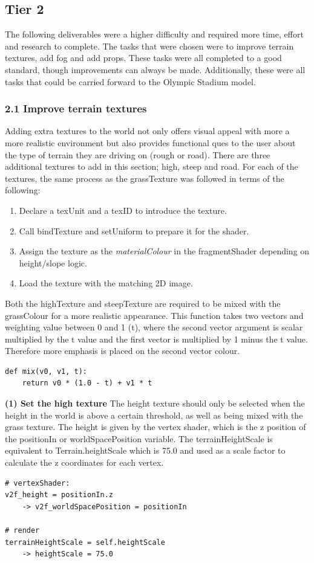 \documentclass[a4 paper, 12pt]{article}
\begin{document}
\subsection{Tier 2}
The following deliverables were a higher difficulty and required more time, effort and research to complete. The tasks that were chosen were to improve terrain textures, add fog and add props. These tasks were all completed to a good standard, though improvements can always be made. Additionally, these were all tasks that could be carried forward to the Olympic Stadium model. 

\subsubsection{2.1 Improve terrain textures}
Adding extra textures to the world not only offers visual appeal with more a more realistic environment but also provides functional ques to the user about the type of terrain they are driving on (rough or road). There are three additional textures to add in this section; high, steep and road. For each of the textures, the same process as the grassTexture was followed in terms of the following:
\begin{enumerate}
    \item Declare a texUnit and a texID to introduce the texture.
    \item Call bindTexture and setUniform to prepare it for the shader.
    \item Assign the texture as the \textit{materialColour} in the fragmentShader depending on height/slope logic.
    \item Load the texture with the matching 2D image.
\end{enumerate}


Both the highTexture and steepTexture are required to be mixed with the grassColour for a more realistic appearance. This function takes two vectors and weighting value between 0 and 1 (t), where the second vector argument is scalar multiplied by the t value and the first vector is multiplied by 1 minus the t value. Therefore more emphasis is placed on the second vector colour.
\begin{lstlisting}
def mix(v0, v1, t):
    return v0 * (1.0 - t) + v1 * t
\end{lstlisting}


\textbf{(1) Set the high texture}
The height texture should only be selected when the height in the world is above a certain threshold, as well as being mixed with the grass texture. The height is given by the vertex shader, which is the z position of the positionIn or worldSpacePosition variable. The terrainHeightScale is equivalent to Terrain.heightScale which is 75.0 and used as a scale factor to calculate the z coordinates for each vertex.
    \begin{lstlisting}
# vertexShader:
v2f_height = positionIn.z
    -> v2f_worldSpacePosition = positionIn 

# render
terrainHeightScale = self.heightScale 
    -> heightScale = 75.0
    \end{lstlisting}
\end{document}
